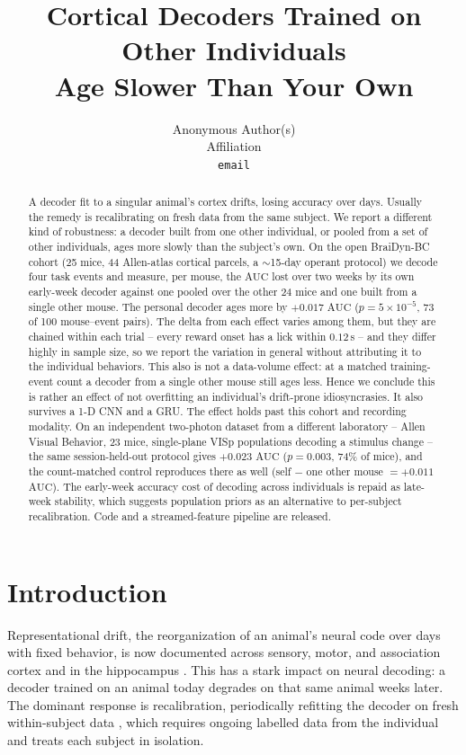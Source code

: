 \documentclass{article}
\title{Cortical Decoders Trained on Other Individuals\\
Age Slower Than Your Own}
\author{%
  Anonymous Author(s)\\
  Affiliation\\
  \texttt{email}\\
}
\newcommand{\auc}{\mathrm{AUC}}
\begin{document}
\maketitle

\begin{abstract}
A decoder fit to a singular animal's cortex drifts, losing accuracy over days. Usually the remedy is
recalibrating on fresh data from the same subject. We report a different kind of robustness: a
decoder built from one other individual, or pooled from a set of other individuals, ages more slowly
than the subject's own. On the open BraiDyn-BC cohort (25 mice, 44 Allen-atlas cortical parcels, a
$\sim$15-day operant protocol) we decode four task events and measure, per mouse, the $\auc$ lost
over two weeks by its own early-week decoder against one pooled over the other 24 mice and one built
from a single other mouse. The personal decoder ages more by $+0.017$ $\auc$
($p = 5 \times 10^{-5}$, 73 of 100 mouse--event pairs). The delta from each effect varies among them,
but they are chained within each trial -- every reward onset has a lick within $0.12$\,s -- and they
differ highly in sample size, so we report the variation in general without attributing it to the
individual behaviors. This also is not a data-volume effect: at a matched training-event count a
decoder from a single other mouse still ages less. Hence we conclude this is rather an effect of not
overfitting an individual's drift-prone idiosyncrasies. It also survives a 1-D CNN and a GRU. The
effect holds past this cohort and recording modality. On an independent two-photon dataset from a
different laboratory -- Allen Visual Behavior, 23 mice, single-plane VISp populations decoding a
stimulus change -- the same session-held-out protocol gives $+0.023$ $\auc$
($p = 0.003$, 74\% of mice), and the count-matched control reproduces there as well
(self $-$ one other mouse $= +0.011$ $\auc$). The
early-week accuracy cost of decoding across individuals is repaid as late-week stability, which
suggests population priors as an alternative to per-subject recalibration. Code and a
streamed-feature pipeline are released.
\end{abstract}

\section{Introduction}
Representational drift, the reorganization of an animal's neural code over days with fixed behavior,
is now documented across sensory, motor, and association cortex and in the hippocampus
\citep{rule2020,driscoll2017,schoonover2021}. This has a stark impact on neural decoding: a decoder
trained on an animal today degrades on that same animal weeks later. The dominant response is
recalibration, periodically refitting the decoder on fresh within-subject data
\citep{degenhart2020,jarosiewicz2015}, which requires ongoing labelled data from the individual and
treats each subject in isolation.
\end{document}
